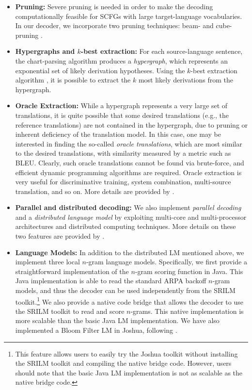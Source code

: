 \documentclass[11pt]{article}
\begin{document}
\begin{itemize}
\item \textbf{Pruning:} Severe pruning is needed in order to make the decoding
computationally feasible for SCFGs with large target-language vocabularies.  In our
decoder, we incorporate two pruning techniques: beam- and cube-pruning \cite{Chiang2007}.

\item \textbf{Hypergraphs and $k$-best extraction:}
For each source-language sentence, the chart-parsing algorithm produces a \emph{hypergraph},
which represents an exponential set of likely derivation hypotheses.  Using the $k$-best
extraction algorithm \cite{Huang2005}, it is possible to extract the $k$ most likely
derivations from the hypergraph.

\item \textbf{Oracle Extraction:}
While a hypergraph represents a very large set of translations, it is quite
possible that some desired translations (e.g., the reference translations)
are not contained in the hypergraph, due to pruning or inherent deficiency
of the translation model.
In this case, one may be interested in finding the so-called \emph{oracle translations},
which are most similar to the desired translations, with similarity measured by
a metric such as B{\small LEU}.
Clearly, such oracle translations cannot be found via brute-force, and efficient
dynamic programming algorithms are required.
Oracle extraction is very useful for discriminative training, system combination,
multi-source translation, and so on. 
More details are provided by .

\item \textbf{Parallel and distributed decoding:}
We also implement \emph{parallel decoding} and a \emph{distributed language model}
by exploiting multi-core and multi-processor architectures and distributed computing
techniques. More details on these two features are provided by .

\item \textbf{Language Models:} In addition to the distributed LM mentioned above,
we implement three local $n$-gram language models. Specifically, we first provide
a straightforward implementation of the $n$-gram scoring function in Java.  This
Java implementation is able to read the standard ARPA backoff $n$-gram models,
and thus the decoder can be used independently from the SRILM toolkit.\footnote{This
feature allows users to easily try the Joshua toolkit without installing the SRILM
toolkit and compiling the native bridge code. However, users should note that the
basic Java LM implementation is not as scalable as the native bridge code.}  We also
provide a native code bridge that allows the decoder to use the SRILM toolkit to
read and score $n$-grams. This native implementation is more scalable than the basic
Java LM implementation. We have also implemented a Bloom Filter LM in Joshua,
following .


\end{itemize}
\end{document}
